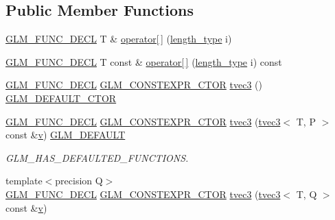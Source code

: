\subsection*{Public Member Functions}
\begin{DoxyCompactItemize}
\item 
\mbox{\hyperlink{setup_8hpp_ab2d052de21a70539923e9bcbf6e83a51}{G\+L\+M\+\_\+\+F\+U\+N\+C\+\_\+\+D\+E\+CL}} T \& \mbox{\hyperlink{structglm_1_1tvec3_ae58fbe8fe435bdd4c928aa08442e7284}{operator\mbox{[}$\,$\mbox{]}}} (\mbox{\hyperlink{structglm_1_1tvec3_a3a79c6a1cfc9fb8821a0a878fa2de91a}{length\+\_\+type}} i)
\item 
\mbox{\hyperlink{setup_8hpp_ab2d052de21a70539923e9bcbf6e83a51}{G\+L\+M\+\_\+\+F\+U\+N\+C\+\_\+\+D\+E\+CL}} T const  \& \mbox{\hyperlink{structglm_1_1tvec3_ae935b1220fdc0e692f0d971315f57a14}{operator\mbox{[}$\,$\mbox{]}}} (\mbox{\hyperlink{structglm_1_1tvec3_a3a79c6a1cfc9fb8821a0a878fa2de91a}{length\+\_\+type}} i) const
\item 
\mbox{\hyperlink{setup_8hpp_ab2d052de21a70539923e9bcbf6e83a51}{G\+L\+M\+\_\+\+F\+U\+N\+C\+\_\+\+D\+E\+CL}} \mbox{\hyperlink{setup_8hpp_ad34178a09666081abdb573c14d1f4a5a}{G\+L\+M\+\_\+\+C\+O\+N\+S\+T\+E\+X\+P\+R\+\_\+\+C\+T\+OR}} \mbox{\hyperlink{structglm_1_1tvec3_a7bdd4b18d0b1f0c4dd84e36949793a11}{tvec3}} () \mbox{\hyperlink{setup_8hpp_afb97a4e995bc004c0cbbfa22125b80ba}{G\+L\+M\+\_\+\+D\+E\+F\+A\+U\+L\+T\+\_\+\+C\+T\+OR}}
\item 
\mbox{\hyperlink{setup_8hpp_ab2d052de21a70539923e9bcbf6e83a51}{G\+L\+M\+\_\+\+F\+U\+N\+C\+\_\+\+D\+E\+CL}} \mbox{\hyperlink{setup_8hpp_ad34178a09666081abdb573c14d1f4a5a}{G\+L\+M\+\_\+\+C\+O\+N\+S\+T\+E\+X\+P\+R\+\_\+\+C\+T\+OR}} \mbox{\hyperlink{structglm_1_1tvec3_ad648640117d2609264432d444b587833}{tvec3}} (\mbox{\hyperlink{structglm_1_1tvec3}{tvec3}}$<$ T, P $>$ const \&\mbox{\hyperlink{glad_8h_a14cfbe2fc2234f5504618905b69d1e06}{v}}) \mbox{\hyperlink{setup_8hpp_aefce7051c376a64ba89fa93a9f63bc2c}{G\+L\+M\+\_\+\+D\+E\+F\+A\+U\+LT}}
\begin{DoxyCompactList}\small\item\em G\+L\+M\+\_\+\+H\+A\+S\+\_\+\+D\+E\+F\+A\+U\+L\+T\+E\+D\+\_\+\+F\+U\+N\+C\+T\+I\+O\+NS. \end{DoxyCompactList}\item 
{\footnotesize template$<$precision Q$>$ }\\\mbox{\hyperlink{setup_8hpp_ab2d052de21a70539923e9bcbf6e83a51}{G\+L\+M\+\_\+\+F\+U\+N\+C\+\_\+\+D\+E\+CL}} \mbox{\hyperlink{setup_8hpp_ad34178a09666081abdb573c14d1f4a5a}{G\+L\+M\+\_\+\+C\+O\+N\+S\+T\+E\+X\+P\+R\+\_\+\+C\+T\+OR}} \mbox{\hyperlink{structglm_1_1tvec3_a23aa4591c3b4e5036831d2d31c12725d}{tvec3}} (\mbox{\hyperlink{structglm_1_1tvec3}{tvec3}}$<$ T, Q $>$ const \&\mbox{\hyperlink{glad_8h_a14cfbe2fc2234f5504618905b69d1e06}{v}})

\end{DoxyCompactItemize}
